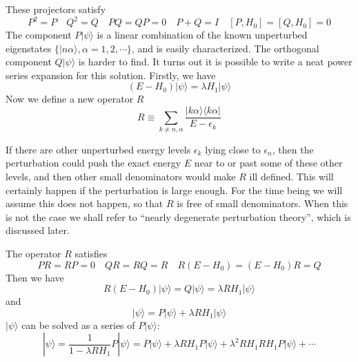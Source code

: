 \documentclass[cyan]{elegantnote}
\begin{document}
These projectors satisfy
\[P^2=P \quad Q^2=Q \quad PQ=QP=0 \quad P+Q=I \quad [P,H_0]=[Q,H_0]=0\]
The component $P|\psi\rangle$ is a linear combination of the known unperturbed eigenstates $\{ |n\alpha\rangle, \alpha = 1,2,\cdots\}$, and is easily characterized. 
The orthogonal component $Q|\psi\rangle$ is harder to find. It turns out it is possible to write a neat power series expansion for this solution. Firstly, we have
\[(E-H_0)|\psi\rangle = \lambda H_1 |\psi\rangle\]
Now we define a new operator $R$
\[R \equiv \sum_{k \neq n,\alpha} \frac{|k\alpha\rangle \langle k\alpha|}{E-\epsilon_k}\]
\begin{note}
If there are other unperturbed energy levels $\epsilon_k$ lying close to $\epsilon_n$, then the perturbation could push
the exact energy $E$ near to or past some of these other levels, and then other small denominators would make $R$ ill defined.
This will certainly happen if the perturbation is large enough. For the time being we will assume this does not happen, so that $R$ is free of small denominators. When this is not the case we shall refer to ``nearly degenerate perturbation theory'', which is discussed later.
\end{note}
\noindent
The operator $R$ satisfies
\[PR=RP=0 \quad QR=RQ=R \quad R(E-H_0) = (E-H_0)R = Q\]
Then we have
\[R(E-H_0)|\psi\rangle = Q|\psi\rangle = \lambda RH_1 |\psi\rangle\]
and
\[|\psi\rangle = P|\psi\rangle + \lambda R H_1 |\psi\rangle\]
$|\psi\rangle$ can be solved as a series of $P|\psi\rangle$:
\[|\psi\rangle = \frac{1}{1-\lambda RH_1} P|\psi\rangle = P|\psi\rangle + \lambda RH_1P|\psi\rangle + \lambda^2 RH_1RH_1 P|\psi\rangle + \cdots\]
\end{document}
